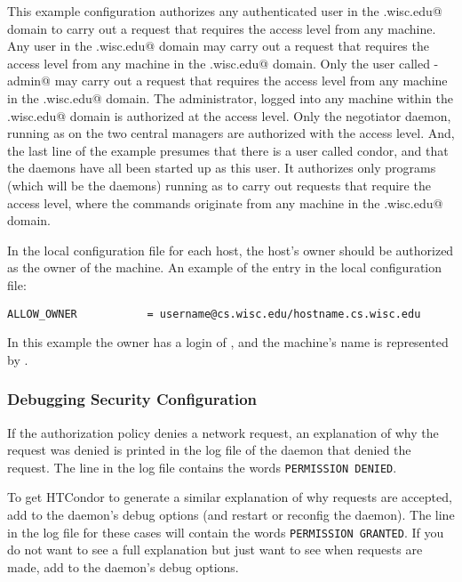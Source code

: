This example configuration authorizes
any authenticated user in the 
\verb@cs.wisc.edu@ domain to 
carry out a request that requires the 
 access level
from any machine.
Any user in the 
\verb@cs.wisc.edu@ domain may 
carry out a request that requires the 
 access level
from any machine in the
\verb@cs.wisc.edu@ domain.
Only the user called \verb@condor-admin@ may 
carry out a request that requires the 
 access level
from any machine in the
\verb@cs.wisc.edu@ domain.
The administrator, logged into any machine within
the \verb@cs.wisc.edu@ domain is authorized at the
 access level.
Only the negotiator daemon, running as
\verb@condor@ on the two central managers
are authorized 
with the
 access level.
And, the last line of the example presumes that there is a
user called condor, and that the daemons have all been started
up as this user.
It authorizes only programs (which will be the daemons)
running as 
\verb@condor@ to
carry out requests that require the 
 access level,
where the commands originate from
any machine in the
\verb@cs.wisc.edu@ domain.

In the local configuration file for each host, the host's
owner should be authorized
as the owner of the machine.
An example of the entry in the local configuration file:
\footnotesize
\begin{verbatim}
ALLOW_OWNER           = username@cs.wisc.edu/hostname.cs.wisc.edu
\end{verbatim}
\normalsize
In this example the owner has a login of
\verb@username@, and the machine's name is represented by
\verb@hostname@.

\subsubsection{\label{sec:Security-Debugging} Debugging Security Configuration}

If the authorization policy denies a network request, an explanation
of why the request was denied is printed in the log file of the daemon
that denied the request.  The line in the log file contains the words
\verb|PERMISSION DENIED|.

To get HTCondor to generate a similar explanation of why requests are
accepted, add  to the daemon's debug options (and
restart or reconfig the daemon).  The line in the log file for these
cases will contain the words \verb|PERMISSION GRANTED|.  If you do not
want to see a full explanation but just want to see when requests
are made, add  to the daemon's debug options.


